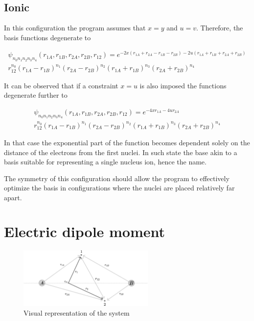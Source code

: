 \documentclass{pracalicmgr}
\begin{document}
\section{Ionic}

In this configuration the program assumes that $x=y$ and $u=v$. Therefore, the basis functions degenerate to

\begin{multline}
    \psi_{n_0 n_1 n_2 n_3 n_4} \left( r_{1A}, r_{1B}, r_{2A}, r_{2B}, r_{12} \right) = e^{-2x\left(r_{1A}+r_{2A}-r_{1B}-r_{2B}\right)-2u\left(r_{1A}+r_{1B}+r_{2A}+r_{2B}\right)}\\
    r_{12}^{n_0}{\left(r_{1A}-r_{1B}\right)}^{n_1}{\left(r_{2A}-r_{2B}\right)}^{n_2}{\left(r_{1A}+r_{1B}\right)}^{n_3}{\left(r_{2A}+r_{2B}\right)}^{n_4}
    \label{ionic form}
\end{multline}

It can be observed that if a constraint $x=u$ is also imposed the functions degenerate further to

\begin{multline}
    \psi_{n_0 n_1 n_2 n_3 n_4} \left( r_{1A}, r_{1B}, r_{2A}, r_{2B}, r_{12} \right) = e^{-4xr_{1A}-4ur_{2A}}\\
    r_{12}^{n_0}{\left(r_{1A}-r_{1B}\right)}^{n_1}{\left(r_{2A}-r_{2B}\right)}^{n_2}{\left(r_{1A}+r_{1B}\right)}^{n_3}{\left(r_{2A}+r_{2B}\right)}^{n_4}
    \label{ionic  degen form}
\end{multline}

In that case the exponential part of the function becomes dependent solely on the distance of the electrons from the first nuclei. In such state the base akin to a basis suitable for representing a single nucleus ion, hence the name.

The symmetry of this configuration should allow the program to effectively optimize the basis in configurations where the nuclei are placed relatively far apart.
\chapter{Electric dipole moment}

\begin{figure}[H]
    \center
    \includegraphics[width=0.6\textwidth]{systemVec.pdf}
    \caption{Visual representation of the system}
\end{figure}
\end{document}
